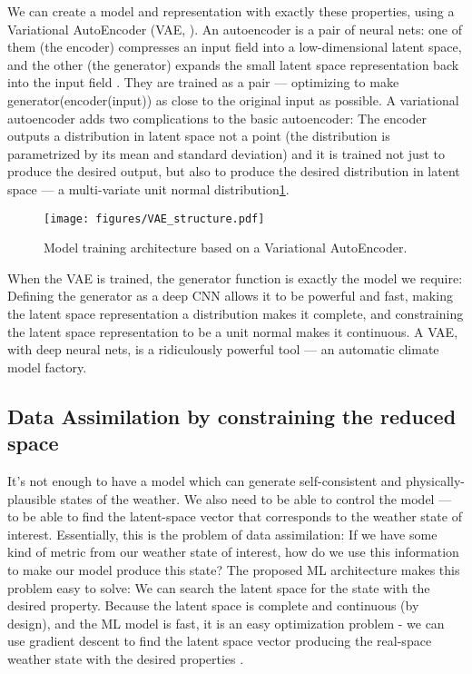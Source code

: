 \documentclass[gmd]{copernicus}
\begin{document}
We can create a model and representation with exactly these properties, using a Variational AutoEncoder (VAE, \citet{VAE_Intro}). An autoencoder is a pair of neural nets: one of them (the encoder) compresses an input field into a low-dimensional latent space, and the other (the generator) expands the small latent space representation back into the input field \citep{Autoencoder}. They are trained as a pair --- optimizing to make generator(encoder(input)) as close to the original input as possible. A variational autoencoder adds two complications to the basic autoencoder: The encoder outputs a distribution in latent space not a point (the distribution is parametrized by its mean and standard deviation) and it is trained not just to produce the desired output, but also to produce the desired distribution in latent space  --- a multi-variate unit normal distribution\ref{VAE_structure}.

\begin{figure}[h]
\texttt{[image: figures/VAE\_structure.pdf]}
\caption{Model training architecture based on a Variational AutoEncoder.}
\label{VAE_structure}
\end{figure}

When the VAE is trained, the generator function is exactly the model we require: Defining the generator as a deep CNN allows it to be powerful and fast, making the latent space representation a distribution makes it complete, and constraining the latent space representation to be a unit normal makes it continuous. A VAE, with deep neural nets, is a ridiculously powerful tool --- an automatic climate model factory.
     
\subsection{Data Assimilation by constraining the reduced space}
\label{section_DA}

It's not enough to have a model which can generate self-consistent and physically-plausible states of the weather. We also need to be able to control the model --- to be able to find the latent-space vector that corresponds to the weather state of interest. Essentially, this is the problem of data assimilation: If we have some kind of metric from our weather state of interest, how do we use this information to make our model produce this state?
The proposed ML architecture makes this problem easy to solve: We can search the latent space for the state with the desired property. Because the latent space is complete and continuous (by design), and the ML model is fast, it is an easy optimization problem - we can use gradient descent to find the latent space vector producing the real-space weather state with the desired properties \citep{MLDA}.
\end{document}
